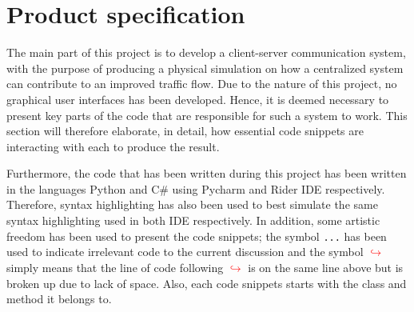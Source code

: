 \section{Product specification}
The main part of this project is to develop a client-server communication system, with the purpose of producing a physical simulation on how a centralized system can contribute to an improved traffic flow. Due to the nature of this project, no graphical user interfaces has been developed. Hence, it is deemed necessary to present key parts of the code that are responsible for such a system to work. This section will therefore elaborate, in detail, how essential code snippets are interacting with each to produce the result.

Furthermore, the code that has been written during this project has been written in the languages Python and C\# using Pycharm and Rider IDE respectively. Therefore, syntax highlighting has also been used to best simulate the same syntax highlighting used in both IDE respectively. In addition, some artistic freedom has been used to present the code snippets; the symbol \verb|...| has been used to indicate irrelevant code to the current discussion and the symbol  \textcolor{red}{$\hookrightarrow$} simply means that the line of code following \textcolor{red}{$\hookrightarrow$} is on the same line above but is broken up due to lack of space. Also, each code snippets starts with the class and method it belongs to.



